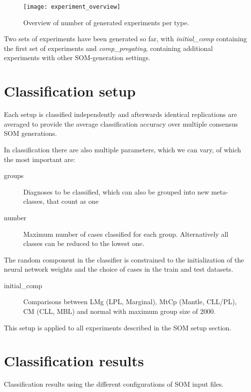 \documentclass[11pt,a4paper]{article}
\begin{document}
\begin{figure}[h]
   \centering
   \texttt{[image: experiment\_overview]}
   \caption{Overview of number of generated experiments per type.}
\end{figure}

Two sets of experiments have been generated so far, with \emph{initial\_comp} containing the first set of experiments and \emph{comp\_pregating}, containing additional experiments with other SOM-generation settings.


\section{Classification setup}

Each setup is classified independently and afterwards identical replications are averaged to provide the average classification
accuracy over multiple consensus SOM generations.

In classification there are also multiple parameters, which we can vary, of which the most important are:

\begin{description}
   \item[groups] Diagnoses to be classified, which can also be grouped into new meta-classes, that count as one
   \item[number] Maximum number of cases classified for each group. Alternatively all classes can be reduced to the lowest one.
\end{description}

The random component in the classifier is constrained to the initialization of the neural network weights and the choice of cases in the train and test datasets.

\begin{description}
   \item[initial\_comp] Comparisons between LMg (LPL, Marginal), MtCp (Mantle, CLL/PL), CM (CLL, MBL) and normal with maximum group size of 2000.
\end{description}

This setup is applied to all experiments described in the SOM setup section.


\section{Classification results}

\begin{table}
   
   \caption{Classification results using the different configurations of SOM input files.}
\end{table}
\end{document}
